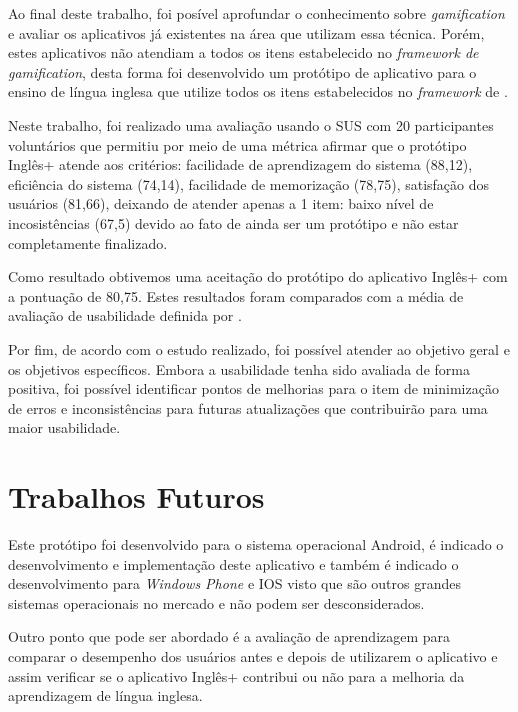 \documentclass[
	12pt,				%
	openany,			%
	oneside,			%
	a4paper,			%
	english,			%
	french,				%
	spanish,			%
	brazil				%
	]{abntex2}
\begin{document}
Ao final deste trabalho, foi posível aprofundar o conhecimento sobre \textit{gamification} e avaliar os aplicativos já existentes na área que utilizam essa técnica. Porém, estes aplicativos não atendiam a todos os itens estabelecido no \textit{framework de gamification}, desta forma foi desenvolvido um protótipo de aplicativo para o ensino de língua inglesa que utilize todos os itens estabelecidos no \textit{framework} de .

Neste trabalho, foi realizado uma avaliação usando o SUS com 20 participantes voluntários que permitiu por meio de uma métrica afirmar que o protótipo Inglês+ atende aos critérios: facilidade  de  aprendizagem  do  sistema  (88,12), eficiência  do  sistema  (74,14), facilidade   de memorização (78,75), satisfação  dos  usuários  (81,66), deixando de atender apenas a 1 item: baixo nível de incosistências (67,5) devido ao fato de ainda ser um protótipo e não estar completamente finalizado.

Como resultado obtivemos uma aceitação do protótipo do aplicativo Inglês+ com a pontuação de 80,75. Estes resultados foram comparados com a média de avaliação de usabilidade definida por . 

Por fim, de acordo com o estudo realizado, foi possível atender ao objetivo geral e os objetivos específicos. Embora a usabilidade tenha sido avaliada de forma positiva, foi possível identificar pontos de melhorias para o item de minimização de erros e inconsistências para futuras atualizações que contribuirão para uma maior usabilidade.

\section {Trabalhos Futuros}
Este protótipo foi desenvolvido para o sistema operacional Android, é indicado o desenvolvimento e implementação deste aplicativo e também é indicado o desenvolvimento para \textit{Windows Phone} e IOS visto que são outros grandes sistemas operacionais no mercado e não podem ser desconsiderados. 

Outro ponto que pode ser abordado é a avaliação de aprendizagem para comparar o desempenho dos usuários antes e depois de utilizarem o aplicativo e assim verificar se o aplicativo Inglês+ contribui ou não para a melhoria da aprendizagem de língua inglesa.



\postextual
\end{document}
